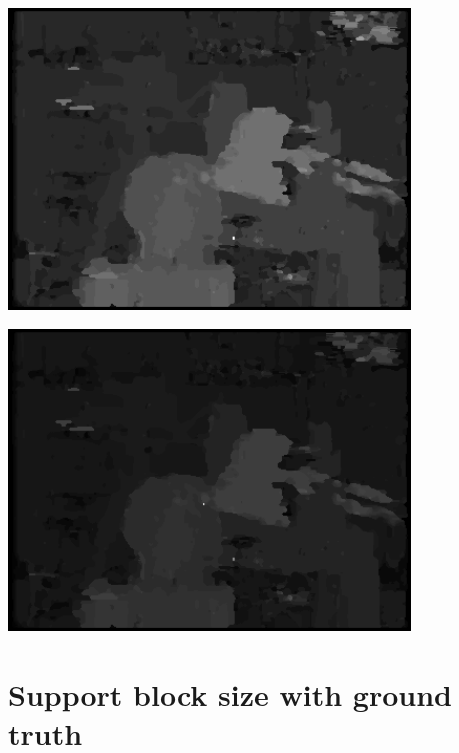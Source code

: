 \documentclass[a4paper]{scrartcl}
\begin{document}
\vspace{1cm}
\begin{minipage}{0.8\textwidth}
  \centering
  \includegraphics[width=0.8\textwidth]{disparity-r3-ssd-d32-m1.png}
  \label{fig:disparity-r3-ssd-d32-m1}
\end{minipage}

\vspace{1cm}
\begin{minipage}{0.8\textwidth}
  \centering
  \includegraphics[width=0.8\textwidth]{disparity-r3-ssd-d64-m1.png}
  \label{fig:disparity-r3-ssd-d64-m1}
\end{minipage}



\section{Support block size with ground truth}
\end{document}
